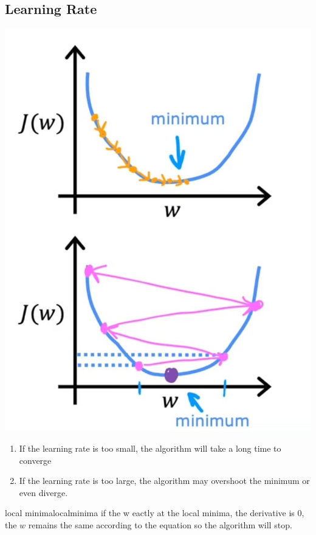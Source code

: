 \subsection*{Learning Rate}
\noindent
\begin{minipage}{0.4\textwidth}
\includegraphics*[width=\textwidth]{images/2.3_2}
\end{minipage}
\begin{minipage}{0.6\textwidth}
\begin{enumerate}
    \item If the learning rate is too small, the algorithm will take a long time to converge\par
    \item If the learning rate is too large, %
    the algorithm may overshoot the minimum or even diverge.
\end{enumerate}
\end{minipage}

\begin{exbox}{local minima}{localminima}
    if the w eactly at the local minima, the derivative is 0,%
    the $w$ remains the same according to the equation so the algorithm will stop.
\end{exbox}

